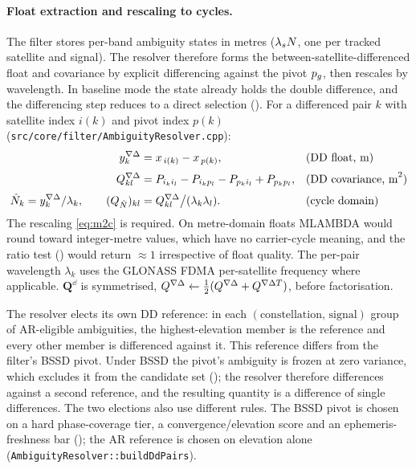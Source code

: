 \documentclass[main.tex]{subfiles}
\begin{document}
\paragraph{Float extraction and rescaling to cycles.}
The filter stores per-band ambiguity states in metres
($\lambda_s N$, one per tracked satellite and signal).  The resolver
therefore forms the between-satellite-differenced float and covariance
by explicit differencing against the pivot $p_{g}$, then rescales by
wavelength.  In baseline mode the state already holds the double
difference, and the differencing step reduces to a direct selection
().  For a differenced pair $k$ with satellite
index $i(k)$ and pivot index $p(k)$
(\texttt{src/core/filter/AmbiguityResolver.cpp}):
\begin{align}
y^{\nabla\Delta}_k &= x_{\,i(k)} - x_{\,p(k)},
  &&\text{(DD float, m)} \label{eq:dd-float}\\[2pt]
Q^{\nabla\Delta}_{kl} &=
  P_{i_k i_l} - P_{i_k p_l}
  - P_{p_k i_l} + P_{p_k p_l},
  &&\text{(DD covariance, m}^2\text{)} \label{eq:dd-cov}\\[2pt]
\hat{N}_k = y^{\nabla\Delta}_k / \lambda_k,
\qquad
(Q_{\hat N})_{kl} &= Q^{\nabla\Delta}_{kl} \big/ (\lambda_k \lambda_l).
  &&\text{(cycle domain)} \label{eq:m2c}
\end{align}
The rescaling \eqref{eq:m2c} is required.  On metre-domain floats
\textsc{MLAMBDA} would round toward integer-metre values, which have no
carrier-cycle meaning, and the ratio test () would
return $\approx 1$ irrespective of float quality.  The per-pair
wavelength $\lambda_k$ uses the GLONASS FDMA per-satellite frequency
where applicable.  $\bm{Q}^{\dd{}}$ is symmetrised,
$Q^{\nabla\Delta} \leftarrow \tfrac12(Q^{\nabla\Delta} + Q^{\nabla\Delta T})$,
before factorisation.

The resolver elects its own DD reference: in each
$(\text{constellation},\,\text{signal})$ group of AR-eligible
ambiguities, the highest-elevation member is the reference and every
other member is differenced against it.  This reference differs from
the filter's BSSD pivot.  Under BSSD the pivot's ambiguity is frozen at
zero variance, which excludes it from the candidate set
(); the resolver therefore differences against a
second reference, and the resulting quantity is a difference of single
differences.  The two elections also use different rules.  The BSSD
pivot is chosen on a hard phase-coverage tier, a convergence/elevation
score and an ephemeris-freshness bar (); the AR reference is chosen on
elevation alone (\texttt{AmbiguityResolver::buildDdPairs}).
\end{document}
